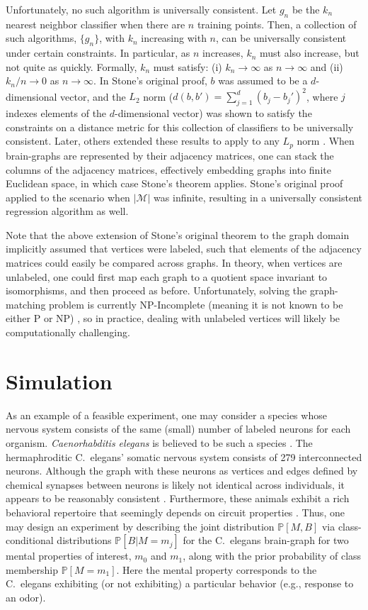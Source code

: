 \documentclass{article}
\newcommand{\conv}{\rightarrow}
\newcommand{\PP}{\mathbb{P}}           %
\providecommand{\mc}[1]{\mathcal{#1}}
\begin{document}
Unfortunately, no such algorithm is universally consistent.  Let $g_n$ be the $k_n$ nearest neighbor classifier when there are $n$ training points.  Then, a collection of such algorithms, $\{g_n\}$,  with $k_n$ increasing with $n$, can be universally consistent under certain constraints. In particular, as $n$ increases, $k_n$ must also increase, but not quite as quickly.  Formally, $k_n$ must satisfy: (i) $k_n \conv \infty$ as $n \conv \infty$ and (ii) $k_n/n \conv 0$ as $n\conv\infty$. In Stone's original proof, $b$ was assumed to be a $d$-dimensional vector, and the $L_2$ norm ($d(b,b')=\sum_{j=1}^d (b_j-b_j')^2$, where $j$ indexes elements of the $d$-dimensional vector) was shown to satisfy the constraints on a distance metric for this collection of classifiers to be universally consistent.  Later, others extended these results to apply to any $L_p$ norm \cite{DGL96}.  When brain-graphs are represented by their adjacency matrices, one can stack the columns of the adjacency matrices, effectively embedding graphs into finite Euclidean space, in which case Stone's theorem applies.  Stone's original proof applied to the scenario when $|\mc{M}|$ was infinite, resulting in a universally consistent regression algorithm as well.

Note that the above extension of Stone's original theorem to the graph domain implicitly assumed that vertices were labeled, such that elements of the adjacency matrices could easily be compared across graphs.  In theory, when vertices are unlabeled, one could first map each graph to a quotient space invariant to isomorphisms, and then proceed as before.  Unfortunately, solving the graph-matching problem is currently NP-Incomplete (meaning it is not known to be either P or NP) \cite{GareyJohnson79}, so in practice, dealing with unlabeled vertices will likely be computationally challenging.



\section{Simulation} %
\label{sec:sim}

As an example of a feasible experiment, one may consider a species whose nervous system consists of the same (small) number of labeled neurons for each organism. {\it Caenorhabditis elegans} is believed to be such a species \cite{Durbin87}. The hermaphroditic C.~elegans' somatic nervous system consists of 279 interconnected neurons. Although the graph with these neurons as vertices and edges defined by chemical synapses between neurons is likely not identical across individuals, it appears to be reasonably consistent \cite{Durbin87}. Furthermore, these animals exhibit a rich behavioral repertoire that seemingly depends on circuit properties \cite{deBonoMaricq05}. Thus, one may design an experiment by describing the joint distribution $\PP[M,B]$ via class-conditional distributions $\PP[B|M=m_j]$ for the C.~elegans brain-graph for two mental properties of interest, $m_0$ and $m_1$, along with the prior probability of class membership $\PP[M=m_1]$. Here the mental property corresponds to the C.~elegans exhibiting (or not exhibiting) a particular behavior (e.g., response to an odor).
\end{document}
